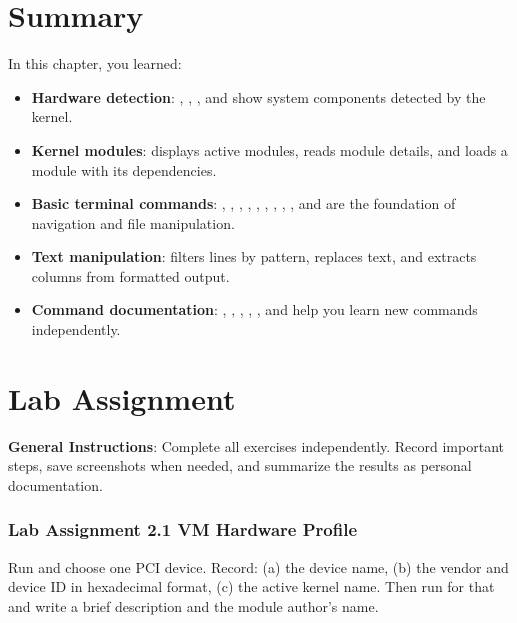 \section{Summary}

In this chapter, you learned:

\begin{itemize}[noitemsep,topsep=2pt]
    \item \textbf{Hardware detection}: , , , and  show system components detected by the kernel.
    \item \textbf{Kernel modules}:  displays active modules,  reads module details, and  loads a module with its dependencies.
    \item \textbf{Basic terminal commands}: , , , , , , , , , and  are the foundation of navigation and file manipulation.
    \item \textbf{Text manipulation}:  filters lines by pattern,  replaces text, and  extracts columns from formatted output.
    \item \textbf{Command documentation}: , , , , , and  help you learn new commands independently.
\end{itemize}

\section{Lab Assignment}

\textbf{General Instructions}: Complete all exercises independently. Record important steps, save screenshots when needed, and summarize the results as personal documentation.

\subsubsection*{Lab Assignment 2.1 VM Hardware Profile}
Run  and choose one PCI device. Record: (a) the device name, (b) the vendor and device ID in hexadecimal format, (c) the active kernel  name. Then run  for that  and write a brief description and the module author's name.


